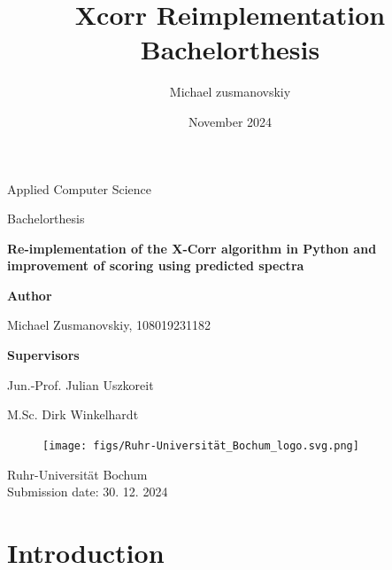 \documentclass[11pt]{article}
\title{Xcorr Reimplementation Bachelorthesis}
\author{Michael zusmanovskiy}
\date{November 2024}
\begin{document}
\begin{titlepage}
    \begin{center}
        \LARGE
        Applied Computer Science

        \vspace{1cm}
        
        \LARGE
        Bachelorthesis

        \vspace{1cm}
            
        \LARGE
        \textbf{Re-implementation of the X-Corr algorithm in Python and improvement of scoring using predicted spectra}
            
        \vspace{1cm}

        \LARGE
        \textbf{Author}
        
        Michael Zusmanovskiy, 108019231182
        
        \vspace{1cm}
        
        \LARGE
        \textbf{Supervisors}
        
        Jun.-Prof. Julian Uszkoreit
        
        M.Sc. Dirk Winkelhardt
            
        \vfill
        
        \begin{figure}[ht]
            \centering
            \texttt{[image: figs/Ruhr-Universität\_Bochum\_logo.svg.png]}
        \end{figure}
            
        \Large
        Ruhr-Universität Bochum\\
        
        Submission date: 30. 12. 2024
            
    \end{center}
\end{titlepage}

\tableofcontents
\newpage

\section{Introduction}
\end{document}
